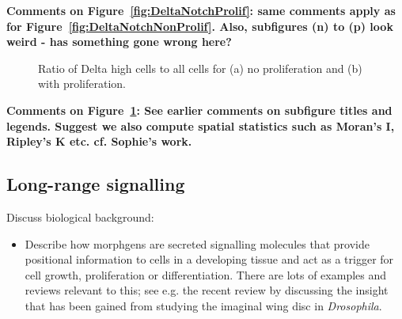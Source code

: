 \documentclass{article}
\newcommand{\highlight}[1]{{\color{red} \bf{#1}}}
\begin{document}
\highlight{Comments on Figure~\ref{fig:DeltaNotchProlif}: same comments apply as for Figure~\ref{fig:DeltaNotchNonProlif}. 
Also, subfigures (n) to (p) look weird - has something gone wrong here?
}

\begin{figure}
\centering
\setlength{\unitlength}{1cm}
\caption{Ratio of Delta high cells to all cells for (a) no proliferation and  (b) with proliferation.}
\label{fig:DeltaNotchStats:metrics}
\end{figure}

\highlight{Comments on Figure~\ref{fig:DeltaNotchStats:metrics}: 
See earlier comments on subfigure titles and legends. 
Suggest we also compute spatial statistics such as Moran's I, Ripley's K etc. 
cf. Sophie's work.
}

\subsection{Long-range signalling} \label{sec:morphagens}

Discuss biological background:
\begin{itemize}
\item Describe how morphgens are secreted signalling molecules that provide positional information to cells in a developing tissue and act as a trigger for cell growth, proliferation or differentiation. There are lots of examples and reviews relevant to this; see e.g. the recent review by \citet{Wartlick2011Understanding} discussing the insight that has been gained from studying the imaginal wing disc in {\it Drosophila}.
\end{itemize}
\end{document}
